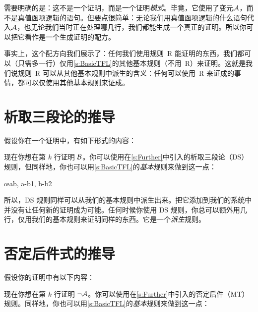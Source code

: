 需要明确的是：这不是一个证明，而是一个证明\emph{模式}。毕竟，它使用了变元$\mathcal{A}$，而不是真值函项逻辑的语句。但要点很简单：无论我们用真值函项逻辑的什么语句代入$\mathcal{A}$，也无论我们当时正在处理哪几行，我们都能生成一个真正的证明。所以你可以把它看作是一个生成证明的配方。

事实上，这个配方向我们展示了：任何我们使用规则~R 能证明的东西，我们都可以（只需多一行）仅用\cref{s:BasicTFL}的其他基本规则（不用~R）来证明。这就是我们说规则~R 可以从其他基本规则中派生的含义：任何可以使用~R 来证成的事情，都可以仅使用其他基本规则来证成。

\section{析取三段论的推导}
假设你在一个证明中，有如下形式的内容：


\begin{fitchproof}
\end{fitchproof}


现在你想在第 $k$ 行证明 $\mathcal{B}$。你可以使用在\cref{s:Further}中引入的析取三段论（DS）规则，但同样地，你也可以用\cref{s:BasicTFL}的\emph{基本}规则来做到这一点：


\begin{fitchproof}
		\open
			\AS
		\close
		\open
			\AS
		\close
	\oe{ab, a-b1, b-b2}
\end{fitchproof}


所以，DS 规则同样可以从我们的基本规则中派生出来。把它添加到我们的系统中并没有让任何新的证明成为可能。任何时候你使用 DS 规则，你总可以额外用几行，仅用我们的基本规则来证明同样的东西。它是一个\emph{派生}规则。

\section{否定后件式的推导}
假设你的证明中有以下内容：


\begin{fitchproof}
\end{fitchproof}


现在你想在第 $k$ 行证明 $\neg \mathcal{A}$。你可以使用在\cref{s:Further}中引入的否定后件（MT）规则。同样地，你也可以用\cref{s:BasicTFL}的\emph{基本}规则来做到这一点：


